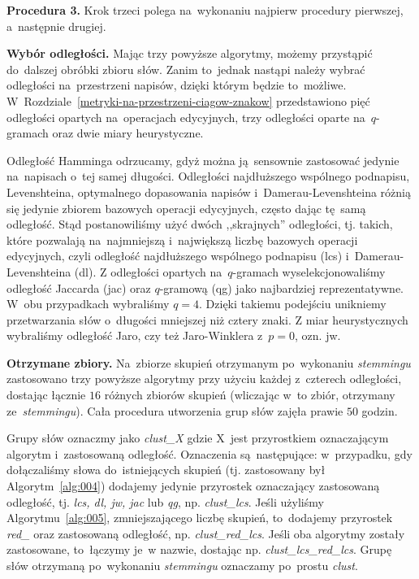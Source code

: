 \documentclass{praca1}
\begin{document}
\textbf{Procedura 3.} Krok trzeci polega na~wykonaniu najpierw procedury pierwszej, a~następnie drugiej.

\textbf{Wybór odległości.} Mając trzy powyższe algorytmy, możemy przystąpić do~dalszej obróbki zbioru słów. Zanim to~jednak nastąpi należy wybrać odległości na~przestrzeni napisów, dzięki którym będzie to~możliwe. W~Rozdziale~\ref{metryki-na-przestrzeni-ciagow-znakow} przedstawiono pięć odległości opartych na~operacjach edycyjnych, trzy odległości oparte na~$q$-gramach oraz dwie miary heurystyczne. 

Odległość Hamminga odrzucamy, gdyż można ją~sensownie zastosować jedynie na~napisach o~tej samej długości. Odległości najdłuższego wspólnego podnapisu, Levenshteina, optymalnego dopasowania napisów i~Damerau-Levenshteina różnią się jedynie zbiorem bazowych operacji edycyjnych, często dając tę~samą odległość. Stąd postanowiliśmy użyć dwóch ,,skrajnych'' odległości, tj. takich, które pozwalają na~najmniejszą i~największą liczbę bazowych operacji edycyjnych, czyli odległość najdłuższego wspólnego podnapisu (lcs) i~Damerau-Levenshteina (dl). Z odległości opartych na~$q$-gramach wyselekcjonowaliśmy odległość Jaccarda (jac) oraz $q$-gramową (qg) jako najbardziej reprezentatywne. W~obu przypadkach wybraliśmy $q=4$. Dzięki takiemu podejściu unikniemy przetwarzania słów o~długości mniejszej niż cztery znaki. Z miar heurystycznych wybraliśmy odległość Jaro, czy też Jaro-Winklera z~$p=0$, ozn. jw.

\textbf{Otrzymane zbiory.} Na~zbiorze skupień otrzymanym po~wykonaniu \emph{stemmingu} zastosowano trzy powyższe algorytmy przy użyciu każdej z~czterech odległości, dostając łącznie $16$ różnych zbiorów skupień (wliczając w~to zbiór, otrzymany ze~\emph{stemmingu}). Cała procedura utworzenia grup słów zajęła prawie $50$ godzin. 

Grupy słów oznaczmy jako \emph{clust\_X} gdzie X~jest przyrostkiem oznaczającym algorytm i~zastosowaną odległość. Oznaczenia są~następujące: w~przypadku, gdy dołączaliśmy słowa do~istniejących skupień (tj. zastosowany był Algorytm~\ref{alg:004}) dodajemy jedynie przyrostek oznaczający zastosowaną odległość, tj. \emph{lcs, dl, jw, jac} lub \emph{qg}, np. \emph{clust\_lcs}. Jeśli użyliśmy Algorytmu~\ref{alg:005}, zmniejszającego liczbę skupień, to~dodajemy przyrostek \emph{red\_} oraz zastosowaną odległość, np. \emph{clust\_red\_lcs}. Jeśli oba algorytmy zostały zastosowane, to~łączymy je~w nazwie, dostając np. \emph{clust\_lcs\_red\_lcs}. Grupę słów otrzymaną po~wykonaniu \emph{stemmingu} oznaczamy po~prostu \emph{clust}. 
\end{document}
